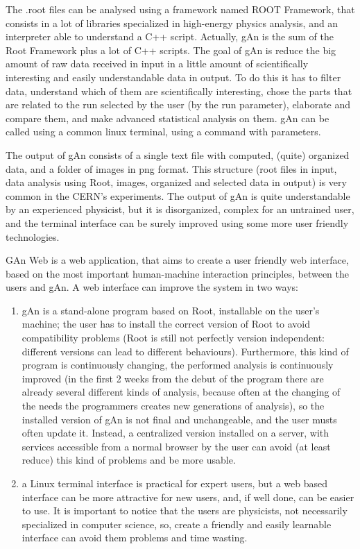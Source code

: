 The .root files can be analysed using a framework named ROOT Framework, that consists in a lot of libraries specialized in high-energy physics analysis, and an interpreter able to understand a C++ script.
Actually, gAn is the sum of the Root Framework plus a lot of C++ scripts.
The goal of gAn is reduce the big amount of raw data received in input in a little amount of scientifically interesting and easily understandable data in output. To do this it has to filter data, understand which of them are scientifically interesting, chose the parts that are related to the run selected by the user (by the run parameter), elaborate and compare them, and make advanced statistical analysis on them.  
gAn can be called using a common linux terminal, using a command with parameters. 

The output of gAn consists of a single text file with computed, (quite) organized data, and a folder of images in png format.
This structure (root files in input, data analysis using Root, images, organized and selected data in output) is very common in the CERN's experiments. 
The output of gAn is quite understandable by an experienced physicist, but it is disorganized, complex for an untrained user, and the terminal interface can be surely improved using some more user friendly technologies.

GAn Web is a web application, that aims to create a user friendly web interface, based on the most important human-machine interaction principles, between the users and gAn.
A web interface can improve the system in two ways:

\begin{enumerate}

\item gAn is a stand-alone program based on Root, installable on the user's machine; the user has to install the correct version of Root to avoid compatibility problems (Root is still not perfectly version independent: different versions can lead to different behaviours). Furthermore, this kind of program is continuously changing, the performed analysis is continuously improved (in the first 2 weeks from the debut of the program there are already several different kinds of analysis, because often at the changing of the needs the programmers creates new generations of analysis), so the installed version of gAn is not final and unchangeable, and the user musts often update it. Instead, a centralized version installed on a server, with services accessible from a normal browser by the user can avoid (at least reduce) this kind of problems and be more usable.    
 

\item a Linux terminal interface is practical for expert users, but a web based interface can be more attractive for new users, and, if well done, can be easier to use. It is important to notice that the users are physicists, not necessarily specialized in computer science, so, create a friendly and easily learnable interface can avoid them problems and time wasting.   


\end{enumerate}



